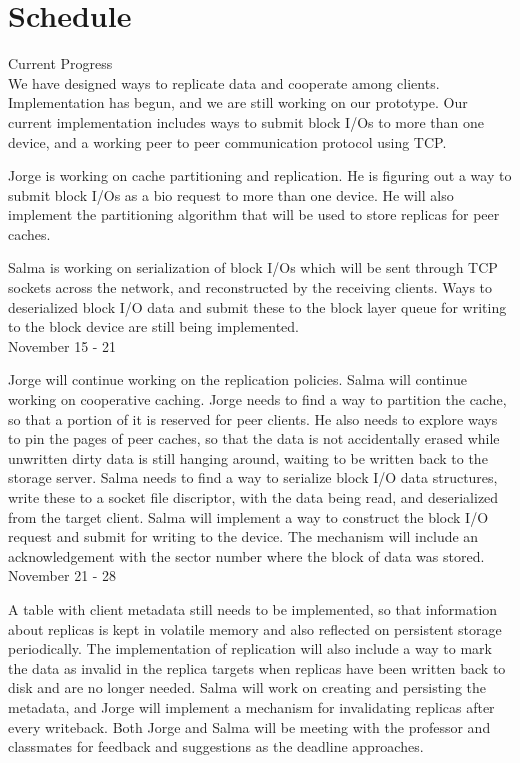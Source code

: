 \section{Schedule}

Current Progress \\

We have designed ways to replicate data and cooperate
among clients. Implementation has begun, and we are still
working on our prototype. Our current implementation
includes ways to submit block I/Os to more than one
device, and a working peer to peer communication protocol
using TCP.

Jorge is working on cache partitioning and replication.
He is figuring out a way to submit block I/Os as a bio
request to more than one device. He will also implement
the partitioning algorithm that will be used to store
replicas for peer caches.

Salma is working on serialization of block I/Os
which will be sent through TCP sockets across the
network, and reconstructed by the receiving clients.
Ways to deserialized block I/O data and submit these to
the block layer queue for writing to the block device
are still being implemented. \\

\setlength{\parindent}{0cm}
November 15 - 21 \\
\setlength{\parindent}{1 em}

Jorge will continue working on the replication policies.
Salma will continue working on cooperative caching.
Jorge needs to find a way to partition the cache, so that
a portion of it is reserved for peer clients. He also
needs to explore ways to pin the pages of peer caches, so
that the data is not accidentally erased while unwritten
dirty data is still hanging around, waiting to be written
back to the storage server. Salma needs to find a way
to serialize block I/O data structures, write these to a
socket file discriptor, with the data being read, and
deserialized from the target client. Salma will implement
a way to construct the block I/O request and submit for
writing to the device. The mechanism will include an
acknowledgement with the sector number where the block of
data was stored. \\

\setlength{\parindent}{0cm}
November 21 - 28 \\
\setlength{\parindent}{1 em}

A table with client metadata still needs to be
implemented, so that information about replicas is kept in
volatile memory and also reflected on persistent storage
periodically. The implementation of replication will also
include a way to mark the data as invalid in the replica
targets when replicas have been written back to disk
and are no longer needed. Salma will work on creating and
persisting the metadata, and Jorge will implement a
mechanism for invalidating replicas after every writeback.
Both Jorge and Salma will be meeting with the professor
and classmates for feedback and suggestions as the deadline
approaches. \\

